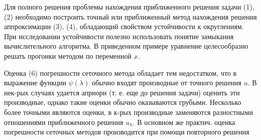 \documentclass[10pt]{article}
\begin{document}
Для полного решения проблемы нахождения приближенного решения задачи (1), (2) необходимо построить точный или приближенный метод нахождения решения аппроксимации (3), (4), обладающий свойством устойчивости к округлениям. При исследовании устойчивости полезно использовать понятие замыкания вычислительного алгоритма. В приведенном примере уравнение целесообразно решать прогонки методом по переменной $x$.



Оценка (6) погрешности сеточного метода обладает тем недостатком, что в выражение функции $\psi(\lambda)$ обычно входят производные от точного решения $u$. В нек-рых случаях удается априори (т. е. еще до решения задачи) оценить эти производные, однако такие оценки обычно оказываются грубыми. Несколько более точными являются оценки, в к-рых производные заменяются разностными отношениями приближенного решения $u_{h}$. В основном же практич. оценка погрешности сеточных методов производится при помощи повторного решения
\end{document}
